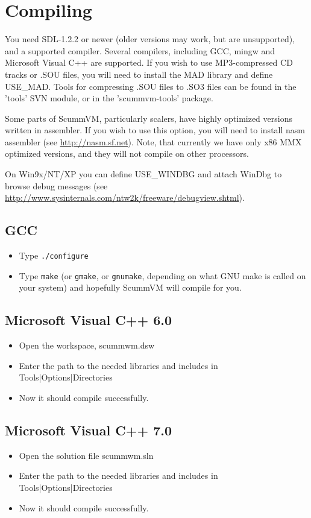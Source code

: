 \section{Compiling}

You need SDL-1.2.2 or newer (older versions may work, but are unsupported), and
a supported compiler. Several compilers, including GCC, mingw and Microsoft
Visual C++ are supported. If you wish to use MP3-compressed CD tracks or
.SOU files, you will need to install the MAD library and define
USE\_MAD. Tools for compressing .SOU files to .SO3 files can be
found in the 'tools' SVN module, or in the 'scummvm-tools' package.

Some parts of ScummVM, particularly scalers, have highly optimized versions 
written in assembler. If you wish to use this option, you will need to install 
nasm assembler (see \url{http://nasm.sf.net}). Note, that currently we have only x86
MMX optimized versions, and they will not compile on other processors.

On Win9x/NT/XP you can define USE\_WINDBG and attach WinDbg to browse debug 
messages (see \url{http://www.sysinternals.com/ntw2k/freeware/debugview.shtml}).

\subsection{GCC}
  \begin{itemize}
  \item Type \texttt{./configure}
  \item Type \texttt{make} (or \texttt{gmake}, or \texttt{gnumake}, depending
        on what GNU make is called on your system) and hopefully ScummVM will
        compile for you.
  \end{itemize}
\subsection{Microsoft Visual C++ 6.0}
  \begin{itemize}
  \item Open the workspace, scummwm.dsw
  \item Enter the path to the needed libraries and includes in
    Tools|Options|Directories
  \item Now it should compile successfully. 
  \end{itemize}
\subsection{Microsoft Visual C++ 7.0}
  \begin{itemize}
  \item Open the solution file scummwm.sln
  \item Enter the path to the needed libraries and includes in
    Tools|Options|Directories
  \item Now it should compile successfully. 
  \end{itemize}
